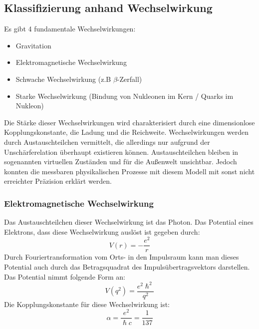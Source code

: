 \documentclass[Ex4_Zusammenfassung.tex]{subfiles}
\begin{document}
\subsection*{Klassifizierung anhand Wechselwirkung}
Es gibt 4 fundamentale Wechselwirkungen:
\begin{itemize}
\item Gravitation
\item Elektromagnetische Wechselwirkung
\item Schwache Wechselwirkung (z.B $\beta$-Zerfall)
\item Starke Wechselwirkung (Bindung von Nukleonen im Kern / Quarks im Nukleon)
\end{itemize}
Die Stärke dieser Wechselwirkungen wird charakterisiert durch eine dimensionlose Kopplungskonstante, die Ladung und die Reichweite.
Wechselwirkungen werden durch Austauschteilchen vermittelt, die allerdings nur aufgrund der Unschärferelation überhaupt existieren können. \newline
Austauschteilchen bleiben in sogenannten virtuellen Zuständen und für die Außenwelt unsichtbar. Jedoch konnten die messbaren physikalischen Prozesse mit diesem Modell mit sonst nicht erreichter Präzision erklärt werden. 
\subsubsection*{Elektromagnetische Wechselwirkung}
Das Austauschteilchen dieser Wechselwirkung ist das Photon.
Das Potential eines Elektrons, dass diese Wechselwirkung auslöst ist gegeben durch:
\begin{equation}
V(r) = -  \frac{e^2}{r}
\end{equation}
Durch Fouriertransformation vom Orts- in den Impulsraum kann man dieses Potential auch durch das Betragsquadrat des Impulsübertragsvektors darstellen. Das Potential nimmt folgende Form an: 
\begin{equation}
V(q^2) = \frac{e^2 \hslash^2}{q^2}
\end{equation}
Die Kopplungskonstante für diese Wechselwirkung ist: 
\begin{equation}
\alpha = \frac{e^2}{\hslash c} = \frac{1}{137}
\end{equation} \newpage 
\end{document}
